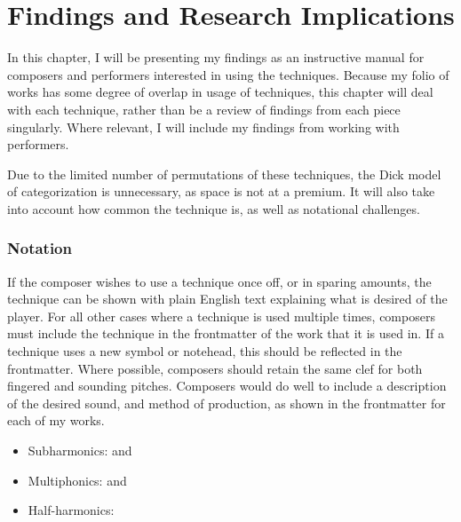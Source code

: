 
\chapter{Findings and Research Implications}\label{ch:chapter4}
In this chapter, I will be presenting my findings as an instructive manual for composers and performers interested in using the techniques.
Because my folio of works has some degree of overlap in usage of techniques, this chapter will deal with each technique, rather than be a review of findings from each piece singularly.
Where relevant, I will include my findings from working with performers.

Due to the limited number of permutations of these techniques, the Dick model of categorization is unnecessary, as space is not at a premium.\autocite{dickOtherFlute1989} 
It will also take into account how common the technique is, as well as notational challenges.

\subsection{Notation}
If the composer wishes to use a technique once off, or in sparing amounts, the technique can be shown with plain English text explaining what is desired of the player.\autocite[494]{gouldBars2011}
For all other cases where a technique is used multiple times, composers must include the technique in the frontmatter of the work that it is used in.\autocite[494]{gouldBars2011}
If a technique uses a new symbol or notehead, this should be reflected in the frontmatter.
Where possible, composers should retain the same clef for both fingered and sounding pitches.\autocite[422]{gouldBars2011}
Composers would do well to include a description of the desired sound, and method of production, as shown in the frontmatter for each of my works. \begin{itemize}
  \item Subharmonics: \hyperref[app:violaPiece Score]{\violaPiece} and \hyperref[app:bassPiece Score]{\bassPiece}
  \item Multiphonics: \hyperref[app:bassPiece Score]{\bassPiece} and \hyperref[app:celloPiece Score]{\celloPiece}
  \item Half-harmonics: \hyperref[app:violinPiece Score]{\violinPiece}
\end{itemize}


